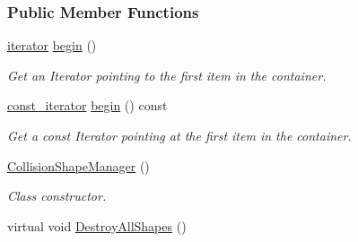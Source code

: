 \subsubsection*{Public Member Functions}
\begin{DoxyCompactItemize}
\item 
\hyperlink{classphys_1_1CollisionShapeManager_a2ed1747351ac8bc8d66a433d6f0d9a90}{iterator} \hyperlink{classphys_1_1CollisionShapeManager_a67f5f640e2d292b1ce61a7ba954ebc00}{begin} ()
\begin{DoxyCompactList}\small\item\em Get an Iterator pointing to the first item in the container. \item\end{DoxyCompactList}\item 
\hyperlink{classphys_1_1CollisionShapeManager_adaff1c411c3aebf4f8de48bc85ff5a82}{const\_\-iterator} \hyperlink{classphys_1_1CollisionShapeManager_a3902743914d6d1383d7e58367249e601}{begin} () const 
\begin{DoxyCompactList}\small\item\em Get a const Iterator pointing at the first item in the container. \item\end{DoxyCompactList}\item 
\hypertarget{classphys_1_1CollisionShapeManager_acb0e37dbc12bd01b7b1389391303634f}{
\hyperlink{classphys_1_1CollisionShapeManager_acb0e37dbc12bd01b7b1389391303634f}{CollisionShapeManager} ()}
\label{classphys_1_1CollisionShapeManager_acb0e37dbc12bd01b7b1389391303634f}

\begin{DoxyCompactList}\small\item\em Class constructor. \item\end{DoxyCompactList}\item 
\hypertarget{classphys_1_1CollisionShapeManager_a42a3ff6e9956c2c436e60284820d84b9}{
virtual void \hyperlink{classphys_1_1CollisionShapeManager_a42a3ff6e9956c2c436e60284820d84b9}{DestroyAllShapes} ()}
\label{classphys_1_1CollisionShapeManager_a42a3ff6e9956c2c436e60284820d84b9}


\end{DoxyCompactItemize}
